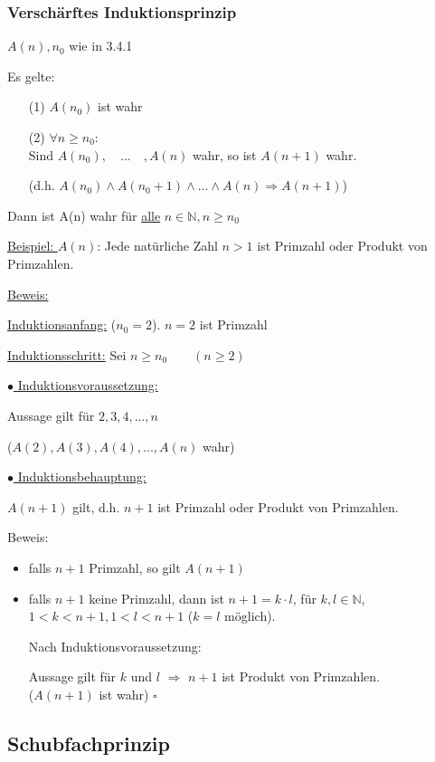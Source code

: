 \documentclass[a4paper, 12pt, twoside] {article}
\begin{document}
\subsubsection{Verschärftes Induktionsprinzip}

$A(n), n_0$ wie in 3.4.1

Es gelte:
\begin{itemize}
	\item[(1)] $A(n_0)$ ist wahr
	\item[(2)] $\forall n \geq n_0:$ \\
	Sind $A(n_0), \quad ... \quad , A(n)$ wahr, so ist $A(n+1)$ wahr.
	
	(d.h. $A(n_0) \land A(n_0+1) \land ... \land A(n) \Rightarrow A(n+1)$)
\end{itemize}
Dann ist A(n) wahr für \underline{alle} $n \in \mathbb{N}, n \geq n_0$

\hfill

\underline{Beispiel: } $A(n)$: Jede natürliche Zahl $n > 1$ ist Primzahl oder Produkt von Primzahlen.

\underline{Beweis:}

\underline{Induktionsanfang:} ($n_0=2$). $n=2$ ist Primzahl \checkmark

\underline{Induktionsschritt:} Sei $n \geq n_0 \qquad (n \geq 2)$

\underline{$\bullet$ Induktionsvoraussetzung:}

Aussage gilt für $2,3,4,...,n$

($A(2),A(3),A(4),...,A(n)$ wahr)

\underline{$\bullet$ Induktionsbehauptung:}

$A(n+1)$ gilt, d.h. $n+1$ ist Primzahl oder Produkt von Primzahlen.

Beweis:

\begin{itemize}
\item falls $n+1$ Primzahl, so gilt $A(n+1)$
\item falls $n+1$ keine Primzahl, dann ist $n+1 = k \cdot l$, für $k,l \in \mathbb{N}$, \\
$1 < k < n+1, 1 < l < n+1$ ($k=l$ möglich).

Nach Induktionsvoraussetzung:

Aussage gilt für $k$ und $l$ $\Rightarrow$ $n+1$ ist Produkt von Primzahlen. \\
($A(n+1)$ ist wahr) \hfill $\square$
\end{itemize}


\subsection{Schubfachprinzip}
\end{document}
